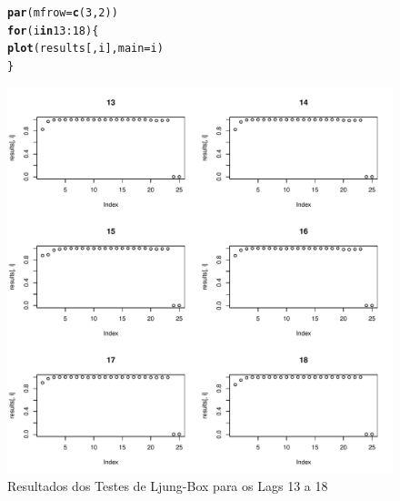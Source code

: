 \documentclass{article}\usepackage[]{graphicx}\usepackage[]{color}
\makeatletter
\def\maxwidth{ %
  \ifdim\Gin@nat@width>\linewidth
    \linewidth
  \else
    \Gin@nat@width
  \fi
}
\newcommand{\hlnum}[1]{\textcolor[rgb]{0.686,0.059,0.569}{#1}}%
\newcommand{\hlopt}[1]{\textcolor[rgb]{0,0,0}{#1}}%
\newcommand{\hlstd}[1]{\textcolor[rgb]{0.345,0.345,0.345}{#1}}%
\newcommand{\hlkwa}[1]{\textcolor[rgb]{0.161,0.373,0.58}{\textbf{#1}}}%
\newcommand{\hlkwc}[1]{\textcolor[rgb]{0.333,0.667,0.333}{#1}}%
\newcommand{\hlkwd}[1]{\textcolor[rgb]{0.737,0.353,0.396}{\textbf{#1}}}%
\newenvironment{kframe}{%
 \def\at@end@of@kframe{}%
 \ifinner\ifhmode%
  \def\at@end@of@kframe{\end{minipage}}%
  \begin{minipage}{\columnwidth}%
 \fi\fi%
 \def\FrameCommand##1{\hskip\@totalleftmargin \hskip-\fboxsep
 \colorbox{shadecolor}{##1}\hskip-\fboxsep
     \hskip-\linewidth \hskip-\@totalleftmargin \hskip\columnwidth}%
 \MakeFramed {\advance\hsize-\width
   \@totalleftmargin\z@ \linewidth\hsize
   \@setminipage}}%
 {\par\unskip\endMakeFramed%
 \at@end@of@kframe}
\newenvironment{knitrout}{}{} %
\makeatother
\begin{document}
            \begin{figure}[H]
            \caption{Resultados dos Testes de Ljung-Box para os Lags 13 a 18}
            \centering
\begin{knitrout}
\color{fgcolor}\begin{kframe}
\begin{alltt}
\hlkwd{par}\hlstd{(}\hlkwc{mfrow} \hlstd{=} \hlkwd{c}\hlstd{(}\hlnum{3}\hlstd{,}\hlnum{2}\hlstd{))}
\hlkwa{for} \hlstd{(i} \hlkwa{in} \hlnum{13}\hlopt{:}\hlnum{18}\hlstd{)\{}
  \hlkwd{plot}\hlstd{(results[,i],} \hlkwc{main}\hlstd{=i)}
\hlstd{\}}
\end{alltt}
\end{kframe}
\includegraphics[width=\maxwidth]{figure/unnamed-chunk-48-1} 

\end{knitrout}
            \end{figure}
\end{document}

